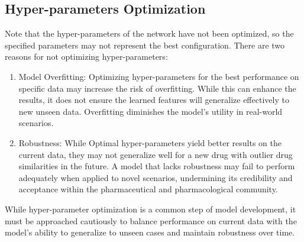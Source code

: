 \documentclass[unnumsec,webpdf,contemporary,large]{oup-authoring-template}%
\theoremstyle{thmstyleone}%
\theoremstyle{thmstyletwo}%
\theoremstyle{thmstylethree}%
\begin{document}
\subsection{Hyper-parameters Optimization}
Note that the hyper-parameters of the network have not been optimized, so the specified parameters may not represent the best configuration. There are two reasons for not optimizing hyper-parameters:
\begin{enumerate}
    \item Model Overfitting: Optimizing hyper-parameters for the best performance on specific data may increase the risk of overfitting. While this can enhance the results, it does not ensure the learned features will generalize effectively to new unseen data. Overfitting diminishes the model’s utility in real-world scenarios.
    \item Robustness: While Optimal hyper-parameters yield better results on the current data, they may not generalize well for a new drug with outlier drug similarities in the future. A model that lacks robustness may fail to perform adequately when applied to novel scenarios, undermining its credibility and acceptance within the pharmaceutical and pharmacological community.
\end{enumerate}
While hyper-parameter optimization is a common step of model development, it must be approached cautiously to balance performance on current data with the model’s ability to generalize to unseen cases and maintain robustness over time.
\end{document}
